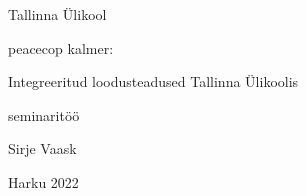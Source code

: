 \begin{titlepage}
\par{Tallinna Ülikool}
\vspace{0.3\textheight}
\par{peacecop kalmer:}
\LARGE
\par{Integreeritud loodusteadused Tallinna Ülikoolis}
\normalsize
\par{seminaritöö}
\vspace{0.3\textheight}
\begin{flushright}
\par{Sirje Vaask}
\end{flushright}
		\vfill
Harku
\hfill
2022
\end{titlepage}
